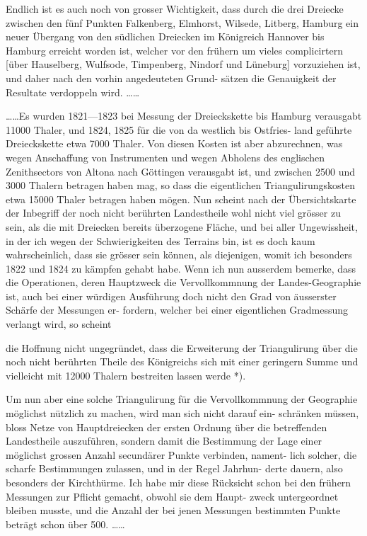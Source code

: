 \documentclass[12pt,a4paper]{article}
\theoremstyle{plain}
\theoremstyle{definition}
\theoremstyle{remark}
\begin{document}
\noindent
Endlich ist es auch noch von grosser Wichtigkeit, dass durch die drei
Dreiecke zwischen den fünf Punkten Falkenberg, Elmhorst, Wilsede, Litberg,
Hamburg ein neuer Übergang von den südlichen Dreiecken im Königreich
Hannover bis Hamburg erreicht worden ist, welcher vor den frühern um
vieles complicirtern [über Hauselberg, Wulfsode, Timpenberg, Nindorf und
Lüneburg] vorzuziehen ist, und daher nach den vorhin angedeuteten Grund-
sätzen die Genauigkeit der Resultate verdoppeln wird. \ldots\ldots


\noindent
\ldots\ldots Es wurden 1821---1823 bei Messung der Dreieckskette bis Hamburg
verausgabt 11000 Thaler, und 1824, 1825 für die von da westlich bis Ostfries-
land geführte Dreieckskette etwa 7000 Thaler. Von diesen Kosten ist aber
abzurechnen, was wegen Anschaffung von Instrumenten und wegen Abholens
des englischen Zenithsectors von Altona nach Göttingen verausgabt ist, und
zwischen 2500 und 3000 Thalern betragen haben mag, so dass die eigentlichen
Triangulirungskosten etwa 15000 Thaler betragen haben mögen. Nun scheint
nach der Übersichtskarte der Inbegriff der noch nicht berührten Landestheile
wohl nicht viel grösser zu sein, als die mit Dreiecken bereits überzogene
Fläche, und bei aller Ungewissheit, in der ich wegen der Schwierigkeiten des
Terrains bin, ist es doch kaum wahrscheinlich, dass sie grösser sein können,
als diejenigen, womit ich besonders 1822 und 1824 zu kämpfen gehabt habe.
Wenn ich nun ausserdem bemerke, dass die Operationen, deren Hauptzweck
die Vervollkommnung der Landes-Geographie ist, auch bei einer würdigen
Ausführung doch nicht den Grad von äusserster Schärfe der Messungen er-
fordern, welcher bei einer eigentlichen Gradmessung verlangt wird, so scheint

\noindent

\noindent
die Hoffnung nicht ungegründet, dass die Erweiterung der Triangulirung über
die noch nicht berührten Theile des Königreichs sich mit einer geringern
Summe und vielleicht mit 12000 Thalern bestreiten lassen werde *).

\noindent
Um nun aber eine solche Triangulirung für die Vervollkommnung der
Geographie möglichst nützlich zu machen, wird man sich nicht darauf ein-
schränken müssen, bloss Netze von Hauptdreiecken der ersten Ordnung über
die betreffenden Landestheile auszuführen, sondern damit die Bestimmung der
Lage einer möglichst grossen Anzahl secundärer Punkte verbinden, nament-
lich solcher, die scharfe Bestimmungen zulassen, und in der Regel Jahrhun-
derte dauern, also besonders der Kirchthürme. Ich habe mir diese Rücksicht
schon bei den frühern Messungen zur Pflicht gemacht, obwohl sie dem Haupt-
zweck untergeordnet bleiben musste, und die Anzahl der bei jenen Messungen
bestimmten Punkte beträgt schon über 500. \ldots\ldots
\end{document}
